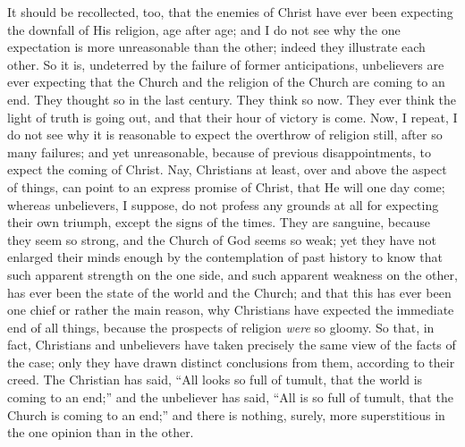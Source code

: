 It should be recollected, too, that the enemies of Christ have ever
been expecting the downfall of His religion, age after age; and I do
not see why the one expectation is more unreasonable than the other;
indeed they illustrate each other. So it is, undeterred by the failure
of former anticipations, unbelievers are ever expecting that the
Church and the religion of the Church are coming to an end. They
thought so in the last century. They think so now. They ever think the
light of truth is going out, and that their hour of victory is come.
Now, I repeat, I do not see why it is reasonable to expect the
overthrow of religion still, after so many failures; and yet
unreasonable, because of previous disappointments, to expect the
coming of Christ. Nay, Christians at least, over and above the aspect
of things, can point to an express promise of Christ, that He will one
day come; whereas unbelievers, I suppose, do not profess any grounds
at all for expecting their own triumph, except the signs of the times.
They are sanguine, because they seem so strong, and the Church of God
seems so weak; yet they have not enlarged their minds enough by the
contemplation of past history to know that such apparent strength on
the one side, and such apparent weakness on the other, has ever been
the state of the world and the Church; and that this has ever been one
chief or rather the main reason, why Christians have expected the
immediate end of all things, because the prospects of religion \emph{were}
so gloomy. So that, in fact, Christians and unbelievers have taken
precisely the same view of the facts of the case; only they have drawn
distinct conclusions from them, according to their creed. The
Christian has said, ``All looks so full of tumult, that the world
is coming to an end;'' and the unbeliever has said, ``All is
so full of tumult, that the Church is coming to an end;'' and
there is nothing, surely, more superstitious in the one opinion than
in the other.

